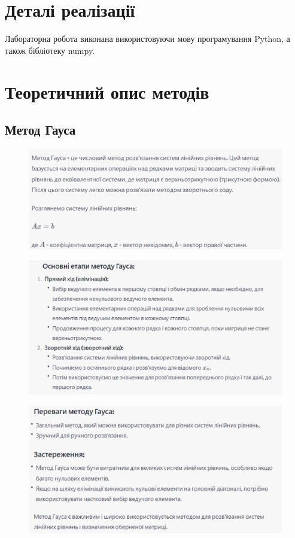 \documentclass[a4paper, 12pt]{article}
\begin{document}
\section{Деталі реалізації}

Лабораторна робота виконана використовуючи мову програмування Python, а також бібліотеку numpy.

\clearpage
\section{Теоретичний опис методів}
\subsection{Метод Гауса}

\begin{figure}[ht]
	\centering
	\includegraphics[width=0.75\linewidth]{gauss1.png}
\end{figure}
\begin{figure}[ht]
	\centering
	\includegraphics[width=0.75\linewidth]{gauss2.png}
\end{figure}
\begin{figure}[ht]
	\centering
	\includegraphics[width=0.75\linewidth]{gauss3.png}
\end{figure}
\end{document}
